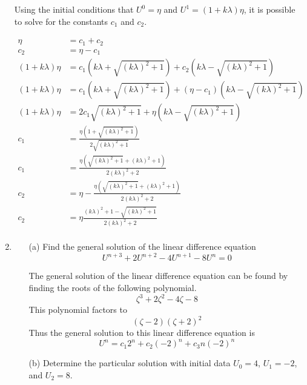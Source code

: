 \documentclass[11pt, oneside, titlepage]{article}
\begin{document}
\begin{enumerate}
        Using the initial conditions that $U^0 = \eta$ and
        $U^1 = (1 + k\lambda)\eta$, it is possible to solve for the constants
        $c_1$ and $c_2$.

        \begin{align*}
            \eta &= c_1 + c_2 \\
            c_2 &= \eta - c_1 \\
            (1 + k\lambda)\eta &= c_1(k\lambda + \sqrt{(k\lambda)^2 + 1}) + c_2(k\lambda - \sqrt{(k\lambda)^2 + 1}) \\
            (1 + k\lambda)\eta &= c_1(k\lambda + \sqrt{(k\lambda)^2 + 1}) + (\eta - c_1)(k\lambda - \sqrt{(k\lambda)^2 + 1}) \\
            (1 + k\lambda)\eta &=  2c_1\sqrt{(k\lambda)^2 + 1} + \eta(k\lambda - \sqrt{(k\lambda)^2 + 1}) \\
            c_1 &= \frac{\eta(1 + \sqrt{(k\lambda)^2 + 1})}{2\sqrt{(k\lambda)^2 + 1}} \\
            c_1 &= \frac{\eta(\sqrt{(k\lambda)^2 + 1} + (k\lambda)^2 + 1)}{2(k\lambda)^2 + 2} \\
            c_2 &= \eta - \frac{\eta(\sqrt{(k\lambda)^2 + 1} + (k\lambda)^2 + 1)}{2(k\lambda)^2 + 2} \\
            c_2 &= \eta\frac{(k\lambda)^2 + 1 -\sqrt{(k\lambda)^2 + 1}}{2(k\lambda)^2 + 2} \\
        \end{align*}


    \item %
        \begin{enumerate}
            \item[(a)]
                Find the general solution of the linear difference equation
                \[
                    U^{n+3} + 2U^{n+2} - 4U^{n + 1} - 8U^n = 0
                \]

                The general solution of the linear difference equation can be
                found by finding the roots of the following polynomial.
                \[
                    \zeta^3 + 2\zeta^2 - 4\zeta - 8
                \]
                This polynomial factors to
                \[
                    (\zeta - 2)(\zeta + 2)^2
                \]
                Thus the general solution to this linear difference equation is
                \[
                    U^n = c_1 2^n + c_2 (-2)^n + c_3 n (-2)^n
                \]

            \item[(b)]
                Determine the particular solution with initial data $U_0 = 4$,
                $U_1 = -2$, and $U_2 = 8$.


\end{enumerate}
\end{enumerate}
\end{document}
